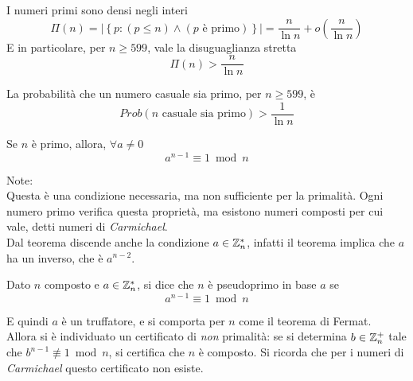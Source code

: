 \begin{theorem}
    \label{teo:primi}
    I numeri primi sono densi negli interi
    \begin{equation*}
        \Pi(n) 
        =
        |
        \left\{ 
            p :
            \left( 
                p \leq n
            \right)
            \wedge
            \left( 
                p \text{ è primo}
            \right)
        \right\}
        |
        = 
        \frac{n}{\ln n}
        + o \left( 
            \frac{n}{\ln n}
        \right)
    \end{equation*}
    E in particolare, per $
    n \geq 599
    $, vale la disuguaglianza stretta
    \begin{equation*}
        \Pi(n) >
        \frac{n}{\ln n}
    \end{equation*}
\end{theorem}
\begin{corollario}
    La probabilità che un numero casuale sia primo, per $
    n \geq 599
    $, è
    \begin{equation*}
        Prob\left( n \text{ casuale sia primo} \right)
        >
        \frac{1}{\ln n}
    \end{equation*}
\end{corollario}

\begin{theorem}
    Se $n$ è primo, allora, $
    \forall a \ne 0
    $
    \begin{equation*}
        a^{n-1} \equiv 1 \bmod n 
    \end{equation*}
    \label{teo:charmichel}
\end{theorem}
\vspace{-25pt}
Note:
\\
Questa è una condizione necessaria, ma non sufficiente per la primalità.
Ogni numero primo verifica questa proprietà, ma esistono numeri composti per cui vale, detti numeri di \emph{Carmichael}.
\\
Dal teorema discende anche la condizione $
a \in \mathbb{Z}_{n}^{*} 
$, infatti il teorema implica che $a$ ha un inverso, che è $a^{n-2}$.
\begin{definition}
    [Pseudoprimo]
    \label{def:pseudoprimo}
    Dato $n$ composto e $
    a \in \mathbb{Z}_{n}^{*} 
    $, si dice che $n$ è pseudoprimo in base $a$ se
    \begin{equation*}
        a^{n-1} \equiv 1 \bmod n 
    \end{equation*}
\end{definition}
E quindi $a$ è un truffatore, e si comporta per $n$ come il teorema di Fermat.
\\
Allora si è individuato un certificato di \emph{non} primalità:
se si determina $
b \in \mathbb{Z}_{n}^{+} 
$ tale che $
b^{n-1} \not\equiv 1 \bmod n 
$, si certifica che $n$ è composto. Si ricorda che per i numeri di \emph{Carmichael} questo certificato non esiste.

